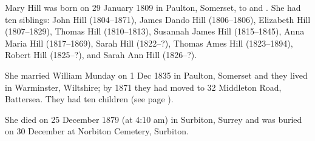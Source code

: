 
Mary Hill was born on 29 January 1809  in Paulton, Somerset, to  and .\cite{MaryHillBirthDeath}
She had ten siblings:  John Hill (1804--1871), James Dando Hill (1806--1806), Elizabeth Hill (1807--1829), Thomas Hill (1810--1813),
Susannah James Hill (1815--1845), Anna Maria Hill (1817--1869), Sarah Hill (1822--?), Thomas Ames Hill (1823--1894), Robert Hill (1825--?),
and Sarah Ann Hill (1826--?).

She married William Munday on 1 Dec 1835 in Paulton, Somerset and they lived in Warminster, Wiltshire; by 1871 they had moved to 32 Middleton Road, Battersea.\cite{MHillResidence}
They had ten children (see page \pageref{William_Munday}).

She died on 25 December 1879 (at 4:10 am) in Surbiton, Surrey and was buried on 30 December at Norbiton Cemetery, Surbiton. \cite{MaryHillBirthDeath}
